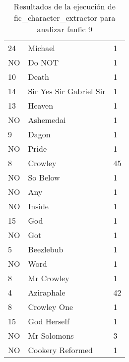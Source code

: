 \documentclass{pre-tfg}
\newcommand{\finalProgramName}{fic\_character\_extractor }
\begin{document}
\begin{table}[t]
{\begin{tabular}{lll}
		24       & Michael       & 1         \\
		NO       & Do NOT        & 1     \\
		10       & Death        & 1     \\
		14       & Sir Yes Sir Gabriel Sir       & 1        \\
		13       & Heaven        & 1     \\
		NO       & Ashemedai        & 1     \\
		9       & Dagon       & 1     \\
		NO       & Pride        & 1     \\
		8       & Crowley        & 45     \\
		NO       & So Below        & 1     \\
		NO       & Any       & 1     \\
		NO       & Inside        & 1     \\
		15       & God        & 1     \\
		NO       & Got        & 1     \\
		5       & Beezlebub       & 1     \\
		NO       & Word        & 1     \\
		8       & Mr Crowley        & 1     \\
		4       & Aziraphale        & 42     \\
		8       & Crowley One        & 1     \\
		15       & God Herself        & 1     \\
		NO       & Mr Solomons        & 3     \\
		NO       & Cookery Reformed        & 1     \\
		
	\end{tabular}%
}
\caption{Resultados de la ejecución de \finalProgramName para analizar fanfic 9}
\label{table:eval1_nertagger}
\end{table}
\end{document}

